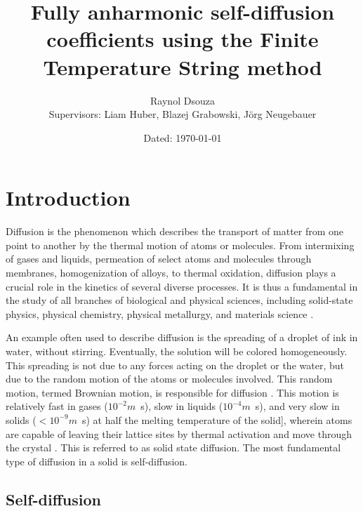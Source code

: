\documentclass{article}
\title{Fully anharmonic self-diffusion coefficients using the Finite Temperature String method}
\date{\small Dated: \today}
\author{Raynol Dsouza\\[0.5cm] {Supervisors: Liam Huber, Blazej Grabowski, Jörg Neugebauer}}
\affil{Max Planck Institut für Eisenforschung, Düsseldorf}
\begin{document}
\maketitle
{}
\newpage
\tableofcontents
\newpage
{}

\section{Introduction}

Diffusion is the phenomenon which describes the transport of matter from one point to another by the thermal motion of atoms or molecules. From intermixing of gases and liquids, permeation of select atoms and molecules through membranes, homogenization of alloys, to thermal oxidation, diffusion plays a crucial role in the kinetics of several diverse processes. It is thus a fundamental in the study of all branches of biological and physical sciences, including solid-state physics, physical chemistry, physical metallurgy, and materials science \cite{Mehrer2007}.

An example often used to describe diffusion is the spreading of a droplet of ink in water, without stirring. Eventually, the solution will be colored homogeneously. This spreading is not due to any forces acting on the droplet or the water, but due to the random motion of the atoms or molecules involved. This random motion, termed Brownian motion, is responsible for diffusion \cite{Einstein1905, Einstein1906}. This motion is relatively fast in gases ($10^{-2}m$\si{\per\second}), slow in liquids ($10^{-4}m$\si{\per\second}), and very slow in solids ($<10^{-9}m$\si{\per\second}) at half the melting temperature of the solid], wherein atoms are capable of leaving their lattice sites by thermal activation and move through the crystal \cite{Mehrer2007}. This is referred to as solid state diffusion. The most fundamental type of diffusion in a solid is self-diffusion.

\subsection{Self-diffusion}
\end{document}
